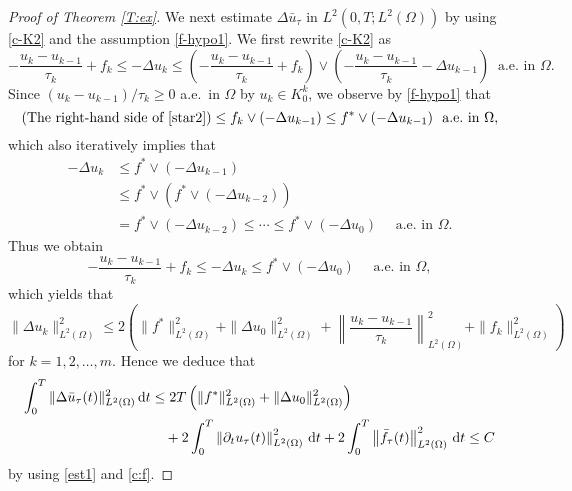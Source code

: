 \documentclass[reqno,10pt]{amsart}
\begin{document}
\begin{proof}[Proof of Theorem \ref{T:ex}]
We next estimate $\Delta \bar u_\tau$ in $L^2(0,T ; L^2(\Omega))$
by using \eqref{c-K2} and the assumption \eqref{f-hypo1}.
We first rewrite \eqref{c-K2} as
\begin{equation}\label{star2}
- \dfrac{u_k-u_{k-1}}{\tau_k} + f_k \leq - \Delta u_k \leq
\left(- \dfrac{u_k-u_{k-1}}{\tau_k} + f_k\right) \vee
\left(- \dfrac{u_k-u_{k-1}}{\tau_k} - \Delta u_{k-1} \right)
\ \mbox{ a.e.~in } \Omega.
\end{equation}
Since $(u_k - u_{k-1})/\tau_k \geq 0$ a.e.~in $\Omega$ by $u_k \in
K^k_0$, we observe by \eqref{f-hypo1} that
$$
\mbox{(The right-hand side of \eqref{star2})}
\leq f_k \vee (-\Delta u_{k-1})
\leq f^* \vee (-\Delta u_{k-1})
\ \mbox{ a.e.~in } \Omega,
$$
which also iteratively implies that
\begin{align*}
 - \Delta u_k &\leq f^* \vee (-\Delta u_{k-1})\\
 &\leq f^* \vee \left( f^* \vee (-\Delta u_{k-2}) \right)\\
 &= f^* \vee (-\Delta u_{k-2})
 \leq \cdots \leq f^* \vee (-\Delta u_0)
\quad \mbox{ a.e.~in } \Omega.
\end{align*}
Thus we obtain
$$
- \dfrac{u_k-u_{k-1}}{\tau_k} + f_k \leq - \Delta u_k \leq
f^* \vee (-\Delta u_0)
\quad \mbox{ a.e.~in } \Omega,
$$
which yields that
$$
\|\Delta u_k\|_{L^2(\Omega)}^2 \leq 
2 \left( \|f^*\|_{L^2(\Omega)}^2 + \|\Delta u_0\|_{L^2(\Omega)}^2 +
\left\|\dfrac{u_k - u_{k-1}}{\tau_k}\right\|_{L^2(\Omega)}^2
+ \|f_k\|_{L^2(\Omega)}^2 \right)
$$
for $k = 1,2,\ldots, m$. Hence we deduce that
\begin{align}
 \int^T_0 \|\Delta \bar u_\tau(t)\|_{L^2(\Omega)}^2 \, {\text{\rm d}} t
 &\leq 2 T \left( \|f^*\|_{L^2(\Omega)}^2 + \|\Delta
 u_0\|_{L^2(\Omega)}^2 \right)\nonumber\\
 &\quad + 2 \int^T_0 \left\| \partial_t u_\tau(t)
 \right\|_{L^2(\Omega)}^2 \, {\text{\rm d}} t
 + 2\int^T_0 \left\| \bar f_\tau (t) \right\|_{L^2(\Omega)}^2 \,{\text{\rm d}} t
 \leq C
\label{dot}
\end{align}
by using \eqref{est1} and \eqref{c:f}.


\end{proof}
\end{document}
